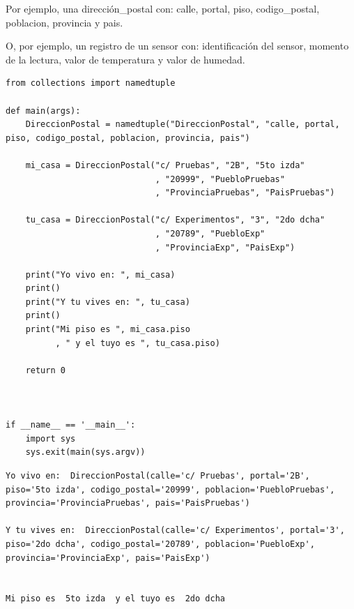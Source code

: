 \documentclass[spanish,12pt,a4paper,final,oneside]{book}
\begin{document}
Por ejemplo, una dirección\_postal con: calle, portal, piso, codigo\_postal, poblacion, provincia y pais.

O, por ejemplo, un registro de un sensor con: identificación del sensor, momento de la lectura, valor de temperatura y valor de humedad.

  

\begin{lstlisting}[frame=single, caption=lenguaje Python]
from collections import namedtuple

def main(args):
    DireccionPostal = namedtuple("DireccionPostal", "calle, portal, piso, codigo_postal, poblacion, provincia, pais")
    
    mi_casa = DireccionPostal("c/ Pruebas", "2B", "5to izda"
                              , "20999", "PuebloPruebas"
                              , "ProvinciaPruebas", "PaisPruebas")
                              
    tu_casa = DireccionPostal("c/ Experimentos", "3", "2do dcha"
                              , "20789", "PuebloExp"
                              , "ProvinciaExp", "PaisExp")
                              
    print("Yo vivo en: ", mi_casa)
    print() 
    print("Y tu vives en: ", tu_casa)   
    print()
    print("Mi piso es ", mi_casa.piso
          , " y el tuyo es ", tu_casa.piso)  
    
    return 0



if __name__ == '__main__':
    import sys
    sys.exit(main(sys.argv))
\end{lstlisting}
\begin{lstlisting}[frame=single]
Yo vivo en:  DireccionPostal(calle='c/ Pruebas', portal='2B', piso='5to izda', codigo_postal='20999', poblacion='PuebloPruebas', provincia='ProvinciaPruebas', pais='PaisPruebas')

Y tu vives en:  DireccionPostal(calle='c/ Experimentos', portal='3', piso='2do dcha', codigo_postal='20789', poblacion='PuebloExp', provincia='ProvinciaExp', pais='PaisExp')


Mi piso es  5to izda  y el tuyo es  2do dcha
\end{lstlisting}
\end{document}
